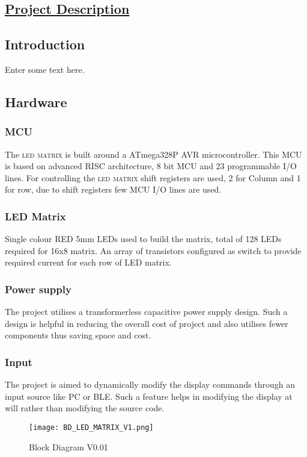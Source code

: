 \vspace*{8.5cm}

\begin{flushright}
	\section*{\huge{\underline{Project Description}}}
\end{flushright}

		\subsection{Introduction}
			Enter some text here.
			
		\subsection{Hardware}
			\subsubsection{MCU}
				The \textsc{led matrix} is built around a ATmega328P AVR microcontroller. This MCU is based on advanced RISC architecture, 8 bit MCU and 23 programmable I/O lines. For controlling the \textsc{led matrix} shift registers are used, 2 for Column and 1 for row, due to shift registers few MCU I/O lines are used.
			\subsubsection{LED Matrix}
				 Single colour  RED 5mm LEDs used to build the matrix, total of 128 LEDs required for 16x8 matrix. An array of transistors configured as switch to provide required current for each row of LED matrix.  
				
			\subsubsection{Power supply}
				The project utilises a transformerless capacitive power supply design. Such a design is helpful in reducing the overall cost of project and also utilises fewer components thus saving space and cost.
			\subsubsection{Input}
				 The project is aimed to dynamically modify the display commands through an input source like PC or BLE. Such a feature helps in modifying the display at will rather than modifying the source code.
				 
			\begin{figure}[H]
					\texttt{[image: BD\_LED\_MATRIX\_V1.png]}
					\caption{Block Diagram V0.01}
					\label{fig:image1}
			\end{figure}
				  



